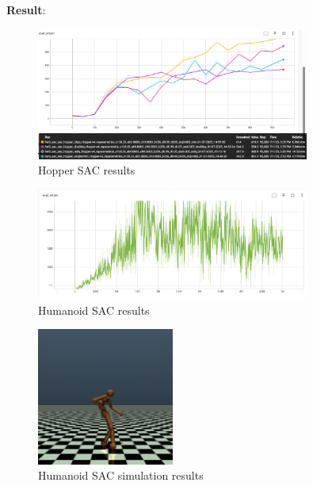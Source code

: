 \textbf{Result}:

\begin{figure}[H]
    \centering
    \includegraphics[width=0.8\textwidth]{imgs/sac/hopper.png}
    \caption{Hopper SAC results}
    \label{fig:hopper_sac}
\end{figure}

\begin{figure}[H]
    \centering
    \includegraphics[width=0.8\textwidth]{imgs/sac/humanoid.png}
    \caption{Humanoid SAC results}
    \label{fig:humanoid_sac}
\end{figure}

\begin{figure}[H]
    \centering
    \includegraphics[width=0.4\textwidth]{imgs/sac/humanoid_sim.png}
    \caption{Humanoid SAC simulation results}
    \label{fig:humanoid_sac_sim}
\end{figure}